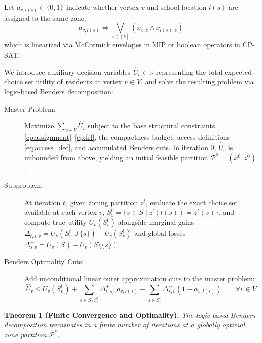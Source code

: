 \documentclass{article}
\begin{document}
Let $a_{v, l(s)} \in \{0, 1\}$ indicate whether vertex $v$ and school location $l(s)$ are assigned to the same zone:
\begin{equation}\label{eq:access_def}
a_{v, l(s)} \iff \bigvee_{z \in [k]} (x_{v,z} \land x_{l(s),z})
\end{equation}
which is linearized via McCormick envelopes in MIP or boolean operators in CP-SAT.

We introduce auxiliary decision variables $\hat{U}_v \in \mathbb{R}$ representing the total expected choice set utility of residents at vertex $v \in V$, and solve the resulting problem via logic-based Benders decomposition:

\begin{description}
    \item[Master Problem:] Maximize $\sum_{v \in V} \hat{U}_v$ subject to the base structural constraints \eqref{cp:assignment}--\eqref{cp:frl}, the compactness budget, access definitions \eqref{eq:access_def}, and accumulated Benders cuts. In iteration 0, $\hat{U}_v$ is unbounded from above, yielding an initial feasible partition $\mathcal{P}^0 = (x^0, z^0)$.
    \item[Subproblem:] At iteration $t$, given zoning partition $z^t$, evaluate the exact choice set available at each vertex $v$, $S_v^t = \{s \in S \mid z^t(l(s)) = z^t(v)\}$, and compute true utility $U_v(S_v^t)$ alongside marginal gains $\Delta_{t,s,v}^+ = U_v(S_v^t \cup \{s\}) - U_v(S_v^t)$ and global losses $\Delta_{s,v}^- = U_v(S) - U_v(S \setminus \{s\})$.
    \item[Benders Optimality Cuts:] Add unconditional linear outer approximation cuts to the master problem:
    \begin{equation}\label{eq:benders_cut}
    \hat{U}_v \leq U_v(S_v^t) + \sum_{s \in S \setminus S_v^t} \Delta_{t,s,v}^+ a_{v, l(s)} - \sum_{s \in S_v^t} \Delta_{s,v}^- (1 - a_{v, l(s)}) \qquad \forall v \in V
    \end{equation}
\end{description}

\noindent\textbf{Theorem 1 (Finite Convergence and Optimality).} \textit{The logic-based Benders decomposition terminates in a finite number of iterations at a globally optimal zone partition $\mathcal{P}^*$.}
\end{document}
